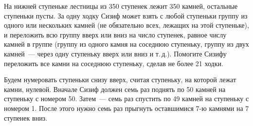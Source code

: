 \problem
На нижней ступеньке лестницы из 350 ступенек лежит 350 камней, остальные
ступеньки пусты.
За одну ходку Сизиф может взять с любой ступеньки группу из одного или
нескольких камней (не обязательно всех, лежащих на этой ступеньке), и
переложить всю группу вверх или вниз на число ступенек, равное числу камней в
группе (группу из одного камня на соседнюю ступеньку, группу из двух камней~---
через одну ступеньку вверх или вниз и т.\,д.).
Помогите Сизифу переложить все камни на соседнюю ступеньку, сделав не более
21 ходки.

\solution
Будем нумеровать ступеньки снизу вверх, считая ступеньку, на которой лежат
камни, нулевой.
Вначале Сизиф должен семь раз поднять по 50 камней на ступеньку с номером 50.
Затем~--- семь раз спустить по 49 камней на ступеньку с номером 1.
После этого нужно семь раз прыгнуть оставшимися 7-ю камнями на 7 ступенек вниз.
\endproblem
